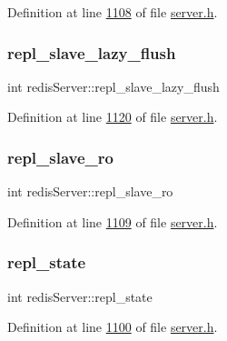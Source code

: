 Definition at line \hyperlink{server_8h_source_l01108}{1108} of file \hyperlink{server_8h_source}{server.\+h}.

\mbox{\label{structredisServer_a33567ee1e9af4d87033b5da6b355065a}} 
\subsubsection{\texorpdfstring{repl\+\_\+slave\+\_\+lazy\+\_\+flush}{repl\_slave\_lazy\_flush}}
{\footnotesize\ttfamily int redis\+Server\+::repl\+\_\+slave\+\_\+lazy\+\_\+flush}



Definition at line \hyperlink{server_8h_source_l01120}{1120} of file \hyperlink{server_8h_source}{server.\+h}.

\mbox{\label{structredisServer_a51f27a1123c714263fb3457ca7c61c1b}} 
\subsubsection{\texorpdfstring{repl\+\_\+slave\+\_\+ro}{repl\_slave\_ro}}
{\footnotesize\ttfamily int redis\+Server\+::repl\+\_\+slave\+\_\+ro}



Definition at line \hyperlink{server_8h_source_l01109}{1109} of file \hyperlink{server_8h_source}{server.\+h}.

\mbox{\label{structredisServer_abe852ad5839544bf0d0855b90f814688}} 
\subsubsection{\texorpdfstring{repl\+\_\+state}{repl\_state}}
{\footnotesize\ttfamily int redis\+Server\+::repl\+\_\+state}



Definition at line \hyperlink{server_8h_source_l01100}{1100} of file \hyperlink{server_8h_source}{server.\+h}.

